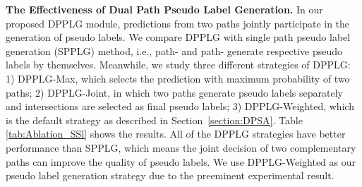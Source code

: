 \documentclass[10pt,twocolumn,letterpaper]{article}
\begin{document}
{\noindent \textbf{The Effectiveness of Dual Path Pseudo Label Generation.}}\hspace{3pt}
In our proposed DPPLG module, predictions from two paths jointly participate in the generation of pseudo labels. We compare DPPLG with single path pseudo label generation (SPPLG) method, i.e., path- and path- generate respective pseudo labels by themselves. Meanwhile, we study three different strategies of DPPLG: 1) DPPLG-Max, which selects the prediction with maximum probability of two paths; 2) DPPLG-Joint, in which two paths generate pseudo labels separately and intersections are selected as final pseudo labels; 3) DPPLG-Weighted, which is the default strategy as described in Section~\ref{section:DPSA}. Table \ref{tab:Ablation_SSl} shows the results. All of the DPPLG strategies have better performance than SPPLG, which means the joint decision of two complementary paths can improve the quality of pseudo labels. We use DPPLG-Weighted as our pseudo label generation strategy due to the preeminent experimental result.
\end{document}
